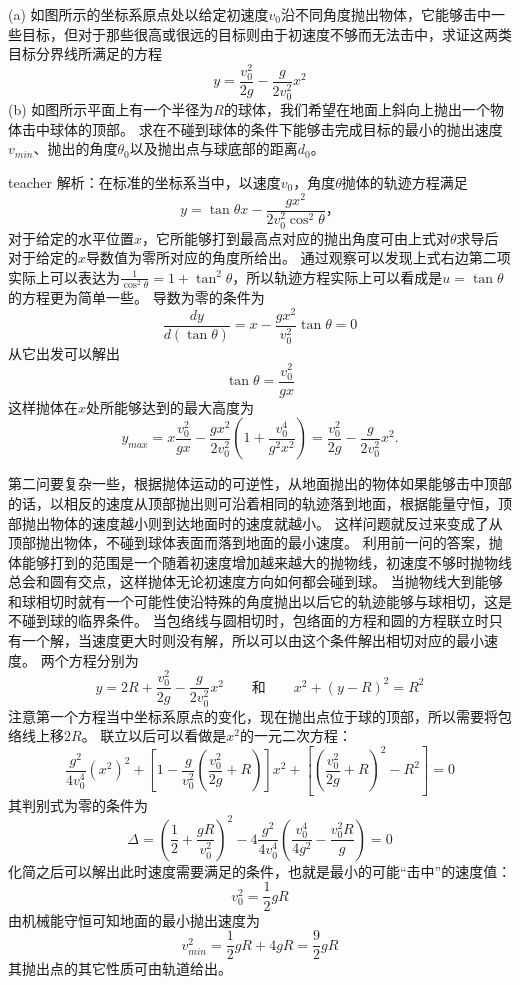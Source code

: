 \begin{example}
(a) 如图所示的坐标系原点处以给定初速度$v_0$沿不同角度抛出物体，它能够击中一些目标，但对于那些很高或很远的目标则由于初速度不够而无法击中，求证这两类目标分界线所满足的方程
\[y=\frac{v_0^2}{2g}-\frac{g}{2v_0^2}x^2\]
(b) 如图所示平面上有一个半径为$R$的球体，我们希望在地面上斜向上抛出一个物体击中球体的顶部。
求在不碰到球体的条件下能够击完成目标的最小的抛出速度$v_{min}$、抛出的角度$\theta_0$以及抛出点与球底部的距离$d_0$。

\begin{taggedblock}{teacher}
\noindent
解析：在标准的坐标系当中，以速度$v_0$，角度$\theta$抛体的轨迹方程满足
\[y=\tan\theta x-\frac{gx^2}{2v_0^2\cos^2\theta}，\]
对于给定的水平位置$x$，它所能够打到最高点对应的抛出角度可由上式对$\theta$求导后对于给定的$x$导数值为零所对应的角度所给出。
通过观察可以发现上式右边第二项实际上可以表达为$\frac{1}{\cos^2\theta}=1+\tan^2\theta$，所以轨迹方程实际上可以看成是$u=\tan\theta$的方程更为简单一些。
导数为零的条件为
\[
\frac{dy}{d(\tan\theta)}=x-\frac{gx^2}{v_0^2}\tan\theta=0
\]
从它出发可以解出
\[
\tan\theta = \frac{v_0^2}{gx}
\]
这样抛体在$x$处所能够达到的最大高度为
\[
y_{max} = x\frac{v_0^2}{gx}-\frac{gx^2}{2v_0^2}(1+\frac{v_0^4}{g^2x^2}) = \frac{v_0^2}{2g}-\frac{g}{2v_0^2}x^2.
\]

第二问要复杂一些，根据抛体运动的可逆性，从地面抛出的物体如果能够击中顶部的话，以相反的速度从顶部抛出则可沿着相同的轨迹落到地面，根据能量守恒，顶部抛出物体的速度越小则到达地面时的速度就越小。
这样问题就反过来变成了从顶部抛出物体，不碰到球体表面而落到地面的最小速度。
利用前一问的答案，抛体能够打到的范围是一个随着初速度增加越来越大的抛物线，初速度不够时抛物线总会和圆有交点，这样抛体无论初速度方向如何都会碰到球。
当抛物线大到能够和球相切时就有一个可能性使沿特殊的角度抛出以后它的轨迹能够与球相切，这是不碰到球的临界条件。
当包络线与圆相切时，包络面的方程和圆的方程联立时只有一个解，当速度更大时则没有解，所以可以由这个条件解出相切对应的最小速度。
两个方程分别为
\[
y=2R+\frac{v_0^2}{2g}-\frac{g}{2v_0^2}x^2 \qquad 和\qquad
x^2+(y-R)^2=R^2
\]
注意第一个方程当中坐标系原点的变化，现在抛出点位于球的顶部，所以需要将包络线上移$2R$。
联立以后可以看做是$x^2$的一元二次方程：
\[
\frac{g^2}{4v_0^4}(x^2)^2 +\left [ 1-\frac{g}{v_0^2}(\frac{v_0^2}{2g}+R) \right ]x^2+\left [  (\frac{v_0^2}{2g}+R)^2-R^2 \right ]=0
\]
其判别式为零的条件为
\[
\Delta =(\frac{1}{2}+\frac{gR}{v_0^2})^2-4\frac{g^2}{4v_0^4}(\frac{v_0^4}{4g^2}-\frac{v_0^2R}{g})=0
\]
化简之后可以解出此时速度需要满足的条件，也就是最小的可能“击中”的速度值：
\[
v_0^2 = \frac{1}{2}gR
\]
由机械能守恒可知地面的最小抛出速度为
\[
v_{min}^2=\frac{1}{2}gR+4gR = \frac{9}{2}gR
\]
其抛出点的其它性质可由轨道给出。



\end{taggedblock}
\end{example}

